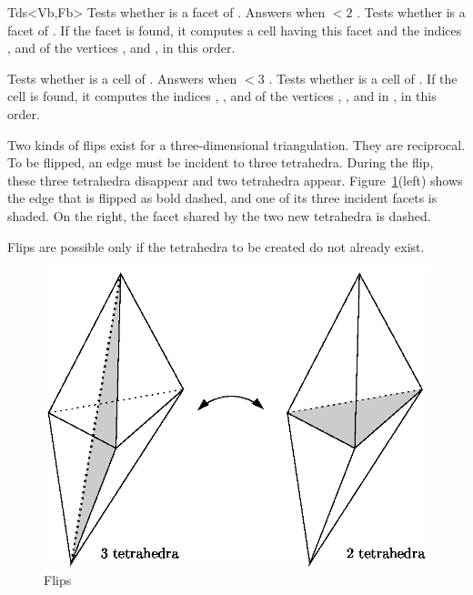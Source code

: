 \begin{ccClassTemplate}{Tds<Vb,Fb>}
{Tests whether  is a facet of \ccVar. Answers  when
 $<2$ .}
\ccGlue
{}
{Tests whether  is a facet of \ccVar. If the facet is found,
it computes a cell  having this facet and the indices ,
 and  of the vertices ,  and , in
this order.} 

{Tests whether  is a cell of \ccVar. Answers  when
 $<3$ .}
{Tests whether  is a cell of \ccVar. If the cell
 is found, it computes the indices , , 
and  of the vertices , ,  and  in
, in this order.} 


Two kinds of flips exist for a three-dimensional triangulation. They
are reciprocal. To be flipped, an edge must be incident to three
tetrahedra. During the flip, these three tetrahedra disappear and two
tetrahedra appear. Figure~\ref{TDS3-fig-flips}(left) shows the
edge that is flipped as bold dashed, and one of its three incident
facets is shaded. On the right, the facet shared by the two new
tetrahedra is dashed. 

Flips are possible only if the tetrahedra to be created do not already 
exist.

\begin{ccTexOnly}
\begin{figure}
\begin{center} 
\includegraphics{flips.eps}
\end{center}
\caption{Flips \label{TDS3-fig-flips}}
\end{figure} 
\end{ccTexOnly}


\end{ccClassTemplate}
